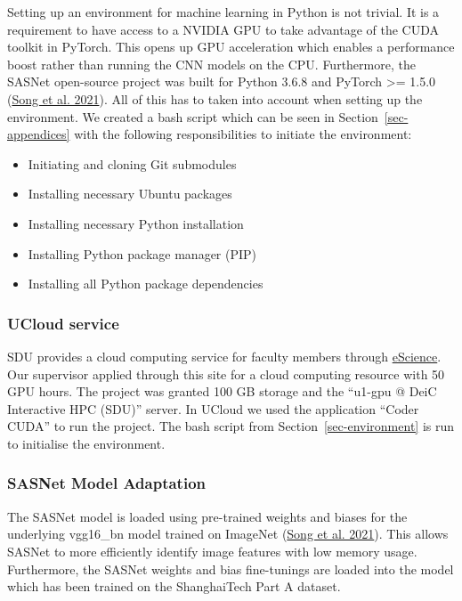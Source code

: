 \documentclass[
]{article}
\begin{document}
Setting up an environment for machine learning in Python is not trivial.
It is a requirement to have access to a NVIDIA GPU to take advantage of
the CUDA toolkit in PyTorch. This opens up GPU acceleration which
enables a performance boost rather than running the CNN models on the
CPU. Furthermore, the SASNet open-source project was built for Python
3.6.8 and PyTorch \textgreater= 1.5.0
(\protect\hyperlink{ref-sasnet}{Song et al. 2021}). All of this has to
taken into account when setting up the environment. We created a bash
script which can be seen in Section~\ref{sec-appendices} with the
following responsibilities to initiate the environment:

\begin{itemize}
\item
  Initiating and cloning Git submodules
\item
  Installing necessary Ubuntu packages
\item
  Installing necessary Python installation
\item
  Installing Python package manager (PIP)
\item
  Installing all Python package dependencies
\end{itemize}

\hypertarget{ucloud-service}{%
\subsubsection{UCloud service}\label{ucloud-service}}

SDU provides a cloud computing service for faculty members through
\href{https://escience.sdu.dk/index.php/national-hpc-systems/}{eScience}.
Our supervisor applied through this site for a cloud computing resource
with 50 GPU hours. The project was granted 100 GB storage and the
``u1-gpu @ DeiC Interactive HPC (SDU)'' server. In UCloud we used the
application ``Coder CUDA'' to run the project. The bash script from
Section~\ref{sec-environment} is run to initialise the environment.

\hypertarget{sasnet-model-adaptation}{%
\subsubsection{SASNet Model Adaptation}\label{sasnet-model-adaptation}}

The SASNet model is loaded using pre-trained weights and biases for the
underlying vgg16\_bn model trained on ImageNet
(\protect\hyperlink{ref-sasnet}{Song et al. 2021}). This allows SASNet
to more efficiently identify image features with low memory usage.
Furthermore, the SASNet weights and bias fine-tunings are loaded into
the model which has been trained on the ShanghaiTech Part A dataset.
\end{document}
